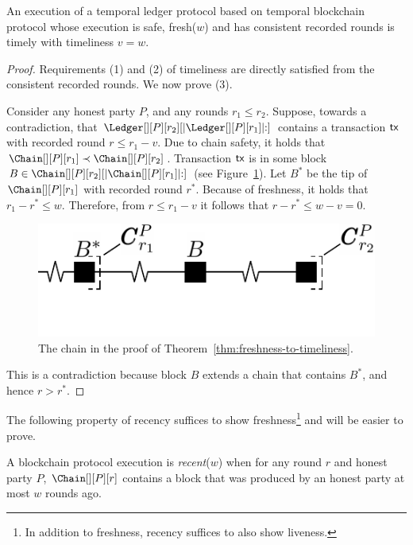 \begin{theorem} \label{thm:freshness-to-timeliness}
  An execution of a temporal ledger protocol based on
  temporal blockchain protocol
  whose execution is safe, fresh($w$) and has consistent recorded rounds is timely with timeliness $v = w$.
\end{theorem}
\begin{proof}
  Requirements (1) and (2) of timeliness are directly satisfied from
  the consistent recorded rounds.
  We now prove (3).

  Consider any honest party $P$, and any rounds $r_1 \leq r_2$.
  Suppose, towards a contradiction, that $\Ledger[][P][r_2][|\Ledger[][P][r_1]|{:}]$
  contains a transaction $\textsf{tx}$ with recorded round $r \leq r_1 - v$.
  Due to chain safety, it holds that $\Chain[][P][r_1] \prec \Chain[][P][r_2]$.
  Transaction $\textsf{tx}$ is in some block $B \in \Chain[][P][r_2][|\Chain[][P][r_1]|{:}]$
  (see Figure~\ref{fig:freshness-to-timeliness}).
  Let $B^*$ be the tip of $\Chain[][P][r_1]$ with recorded round $r^*$.
  Because of freshness, it holds that $r_1 - r^* \leq w$.
  Therefore, from $r \leq r_1 - v$ it follows that $r - r^* \leq w - v = 0$.

  \begin{figure}
    \centering
    \includegraphics[width=0.5\columnwidth,keepaspectratio]{figures/freshness-timeliness.pdf}
    \caption{The chain in the proof of Theorem~\ref{thm:freshness-to-timeliness}.}
    \label{fig:freshness-to-timeliness}
  \end{figure}

  This is a contradiction because block $B$ extends a chain that contains $B^*$,
  and hence $r > r^*$.
  \Qed
\end{proof}

The following property of recency suffices to show freshness\footnote{
  In addition to freshness, recency suffices to also show liveness.
} and will be easier to prove.

\begin{definition}[Recency]
  A blockchain protocol execution is \emph{recent}($w$)
  when for any round $r$ and honest party $P$, $\Chain[][P][r]$
  contains a block that was produced by an honest party
  at most $w$ rounds ago.
\end{definition}


